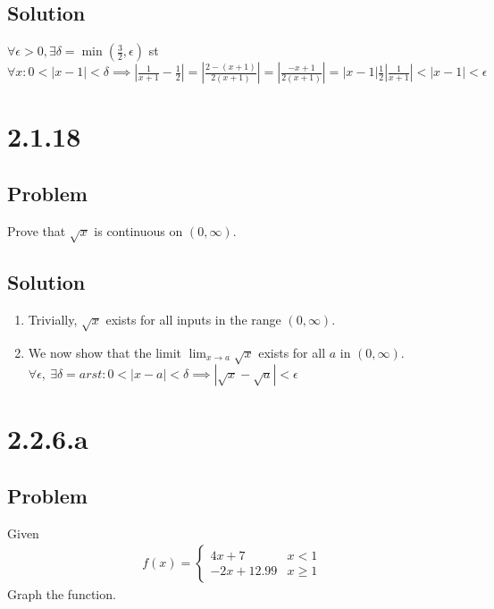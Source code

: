 \documentclass[12pt]{article}
\newcommand{\round}[1]{\left(       #1 \right)      }
\newcommand{\abs}  [1]{\left|       #1 \right|      }
\begin{document}
\subsection*{Solution}
$\forall \epsilon > 0, \exists \delta = \min\round{\frac{3}{2}, \epsilon}$ st $\forall x : 0 < \abs{x - 1} < \delta \implies \abs{\frac{1}{x + 1} - \frac{1}{2}} = \abs{\frac{2 - (x + 1)}{2(x + 1)}} = \abs{\frac{-x + 1}{2(x + 1)}} = \abs{x - 1} \frac{1}{2} \abs{\frac{1}{x + 1}} < \abs{x - 1} < \epsilon$



\section*{2.1.18}

\subsection*{Problem}
Prove that $\sqrt{x}$ is continuous on $(0, \infty)$.

\subsection*{Solution}
\begin{enumerate}
    \item Trivially, $\sqrt{x}$ exists for all inputs in the range $(0, \infty)$.
    \item We now show that the limit $\lim_{x \to a} \sqrt{x}$ exists for all $a$ in $(0, \infty)$. $\forall \epsilon,\ \exists \delta = arst : 0 < \abs{x - a} < \delta \implies \abs{\sqrt{x} - \sqrt{a}} < \epsilon$
\end{enumerate}



\section*{2.2.6.a}

\subsection*{Problem}
Given
\begin{align*}
    f(x) = \begin{cases}
        4x + 7 & x < 1 \\
        -2x + 12.99 & x \geq 1
    \end{cases}
\end{align*}
Graph the function.
\end{document}
